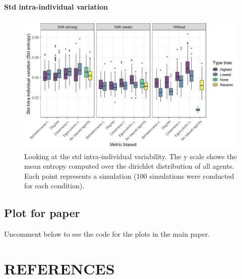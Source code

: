 \documentclass[
]{article}
\begin{document}
\hypertarget{std-intra-individual-variation-4}{%
\paragraph{Std intra-individual
variation}\label{std-intra-individual-variation-4}}

\begin{figure}[!H]

{\centering \includegraphics{./Figures/unnamed-chunk-221-1} 

}

\caption{Looking at the std intra-individual variability. The y scale shows the mean entropy computed over the dirichlet distribution of all agents. Each point represents a simulation (100 simulations were conducted for each condition).}\label{fig:unnamed-chunk-221}
\end{figure}

\hypertarget{plot-for-paper}{%
\subsection{Plot for paper}\label{plot-for-paper}}

Uncomment below to see the code for the plots in the main paper.

\hypertarget{references}{%
\section*{REFERENCES}\label{references}}
\end{document}
